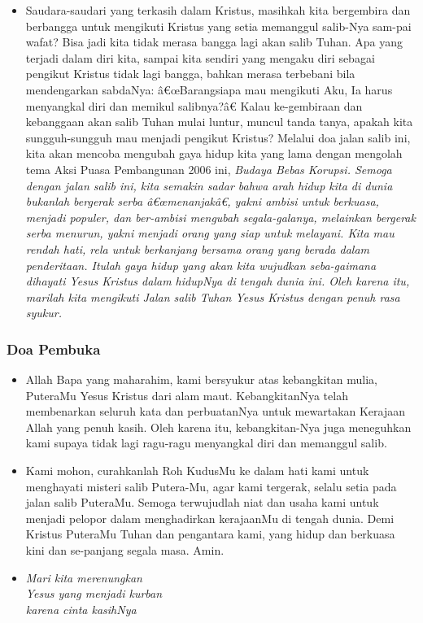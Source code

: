 \documentclass[a5paper,headsepline,titlepage,10pt,nnormalheadings,DIVcalc]{scrbook}
\newcommand{\BU}[1]{\begin{itemize} \item[U:] #1 \end{itemize}}
\newcommand{\BP}[1]{\begin{itemize} \item[P:] #1 \end{itemize}}
\begin{document}
\BP{Saudara-saudari yang terkasih dalam Kristus, masihkah kita bergembira dan berbangga untuk mengikuti Kristus yang setia memanggul salib-Nya sam-pai wafat? Bisa jadi kita tidak merasa bangga lagi akan salib Tuhan. Apa yang terjadi dalam diri kita, sampai kita sendiri yang mengaku diri sebagai pengikut Kristus tidak lagi bangga, bahkan merasa terbebani bila mendengarkan sabdaNya: â€œBarangsiapa mau mengikuti Aku, Ia harus menyangkal diri dan memikul salibnya?â€ Kalau ke-gembiraan dan kebanggaan akan salib Tuhan mulai luntur, muncul tanda tanya, apakah kita sungguh-sungguh mau menjadi pengikut Kristus? Melalui doa jalan salib ini, kita akan mencoba mengubah gaya hidup kita yang lama dengan mengolah tema Aksi Puasa Pembangunan 2006 ini, \it{Budaya Bebas Korupsi}. Semoga dengan jalan salib ini, kita semakin sadar bahwa arah hidup kita di dunia bukanlah bergerak serba â€œmenanjakâ€, yakni ambisi untuk berkuasa, menjadi populer, dan ber-ambisi mengubah segala-galanya, melainkan bergerak serba \it{menurun}, yakni menjadi orang yang siap untuk melayani. Kita mau rendah hati, rela untuk berkanjang bersama orang yang berada dalam penderitaan. Itulah gaya hidup yang akan kita wujudkan seba-gaimana dihayati Yesus Kristus dalam hidupNya di tengah dunia ini. Oleh karena itu, marilah kita mengikuti Jalan salib Tuhan Yesus Kristus dengan penuh rasa syukur.}

\subsubsection*{Doa Pembuka}

\BP{Allah Bapa yang maharahim, kami bersyukur atas kebangkitan mulia, PuteraMu Yesus Kristus dari alam maut. KebangkitanNya telah membenarkan seluruh kata dan perbuatanNya untuk mewartakan Kerajaan Allah yang penuh kasih. Oleh karena itu, kebangkitan-Nya juga meneguhkan kami supaya tidak lagi ragu-ragu menyangkal diri dan memanggul salib.}
\BU{Kami mohon, curahkanlah Roh KudusMu ke dalam hati kami untuk menghayati misteri salib Putera-Mu, agar kami tergerak, selalu setia pada jalan salib PuteraMu. Semoga terwujudlah niat dan usaha kami untuk menjadi pelopor dalam menghadirkan kerajaanMu di tengah dunia. Demi Kristus PuteraMu Tuhan dan pengantara kami, yang hidup dan berkuasa kini dan se-panjang segala masa. Amin.}

\begin{itemize}
\item[1.] \it{Mari kita merenungkan\\
Yesus yang menjadi kurban\\
karena cinta kasihNya}
\end{itemize}
\end{document}
